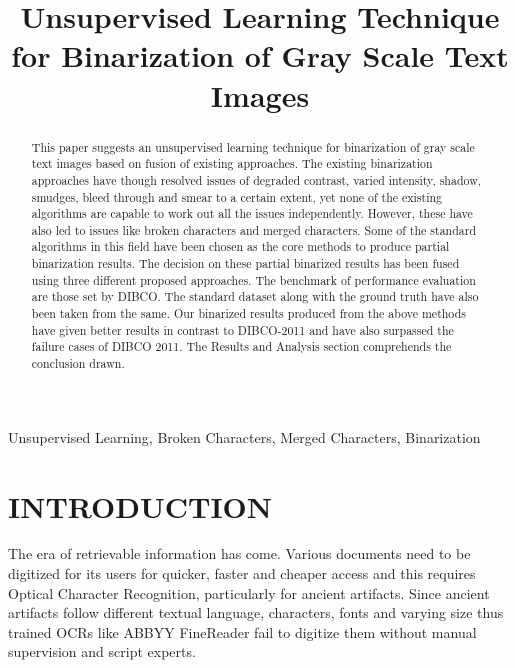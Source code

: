 \documentclass[conference]{IEEEtran}
\begin{document}
\title{Unsupervised Learning Technique for Binarization of Gray Scale Text Images}

\author{
    \and
}

\maketitle

\begin{abstract}
This paper suggests an unsupervised learning technique for binarization of gray scale text images based on fusion of existing approaches. The existing binarization approaches have though resolved issues of degraded contrast, varied intensity, shadow, smudges, bleed through and smear to a certain extent, yet none of the existing algorithms are capable to work out all the issues independently. However, these have also led to issues like broken characters and merged characters. Some of the standard algorithms in this field have been chosen as the core methods to produce partial binarization results. The decision on these partial binarized results has been fused using three different proposed approaches. The benchmark of performance evaluation are those set by DIBCO. The standard dataset along with the ground truth have also been taken from the same. Our binarized results produced from the above methods have given better results in contrast to DIBCO-2011 and have also surpassed the failure cases of DIBCO 2011. The Results and Analysis section comprehends the conclusion drawn.
\end{abstract}

\begin{IEEEkeywords}
Unsupervised Learning, Broken Characters, Merged Characters, Binarization
\end{IEEEkeywords}

\section{INTRODUCTION}
The era of retrievable information has come. Various documents need to be digitized for its users for quicker, faster and cheaper access and this requires Optical Character Recognition, particularly for ancient artifacts. Since ancient artifacts follow different textual language, characters, fonts and varying size thus trained OCRs like ABBYY FineReader fail to digitize them without manual supervision and script experts.
\end{document}
